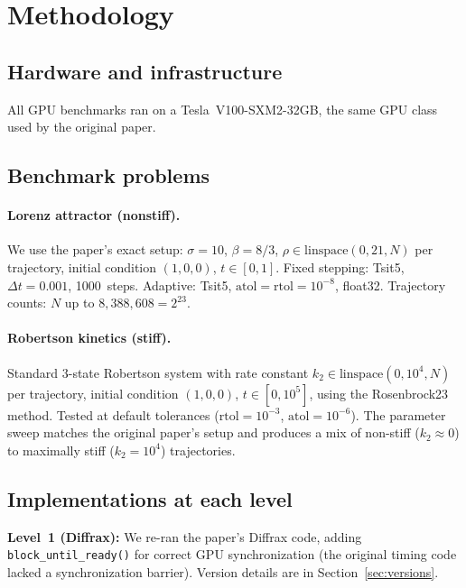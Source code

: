\documentclass[11pt]{article}
\begin{document}
\section{Methodology}

\subsection{Hardware and infrastructure}

All GPU benchmarks ran on a Tesla~V100-SXM2-32GB, the same GPU
class used by the original paper.

\subsection{Benchmark problems}

\paragraph{Lorenz attractor (nonstiff).}
We use the paper's exact setup:
$\sigma = 10$, $\beta = 8/3$,
$\rho \in \mathrm{linspace}(0, 21, N)$ per trajectory, initial
condition $(1, 0, 0)$, $t \in [0, 1]$.
Fixed stepping: Tsit5, $\Delta t = 0.001$, 1000~steps.
Adaptive: Tsit5, $\mathrm{atol} = \mathrm{rtol} = 10^{-8}$,
float32.
Trajectory counts: $N$ up to $8{,}388{,}608 = 2^{23}$.

\paragraph{Robertson kinetics (stiff).}
Standard 3-state Robertson system with rate constant
$k_2 \in \mathrm{linspace}(0, 10^4, N)$ per trajectory,
initial condition $(1, 0, 0)$, $t \in [0, 10^5]$,
using the Rosenbrock23 method.
Tested at default tolerances
($\mathrm{rtol}=10^{-3}$, $\mathrm{atol}=10^{-6}$).
The parameter sweep matches the original paper's setup and
produces a mix of non-stiff ($k_2 \approx 0$) to maximally
stiff ($k_2 = 10^4$) trajectories.

\subsection{Implementations at each level}

\textbf{Level~1 (Diffrax):}
We re-ran the paper's Diffrax code, adding
\texttt{block\_until\_ready()} for correct GPU synchronization
(the original timing code lacked a synchronization barrier).
Version details are in Section~\ref{sec:versions}.
\end{document}
